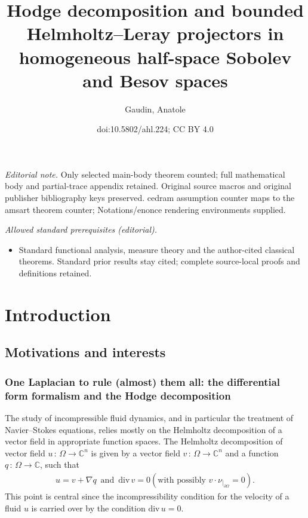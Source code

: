 \documentclass[10pt]{amsart}
\title{Hodge decomposition and bounded Helmholtz--Leray projectors in homogeneous half-space Sobolev and Besov spaces}
\author{Gaudin, Anatole}
\date{doi:10.5802/ahl.224; CC BY 4.0}
\theoremstyle{definition}\newtheorem{defi}[theo]{Definition}\newtheorem{rema}[theo]{Remark}\newtheorem{exam}[theo]{Example}\newtheorem{exem}[theo]{Example}\newtheorem{nota}[theo]{Notation}
\renewcommand*{\div}{\mathrm{div\,}}
\newcommand{\bbC}{\mathbb{C}}
\begin{document}
\maketitle
\noindent\textit{Editorial note.} Only selected main-body theorem counted; full mathematical body and partial-trace appendix retained. Original source macros and original publisher bibliography keys preserved. cedram assumption counter maps to the amsart theorem counter; Notations/enonce rendering environments supplied.\par\medskip
\noindent\textit{Allowed standard prerequisites (editorial).}\begin{itemize}
\item Standard functional analysis, measure theory and the author-cited classical theorems. Standard prior results stay cited; complete source-local proofs and definitions retained.
\end{itemize}\medskip
\setcounter{tocdepth}{3}
\tableofcontents

\section{Introduction}


\subsection{Motivations and interests}

\subsubsection{One Laplacian to rule (almost) them all: the differential form formalism and the Hodge decomposition}

The study of incompressible fluid dynamics, and in particular the treatment of Navier--Stokes equations, relies mostly on the Helmholtz decomposition of a vector field in appropriate function spaces. The Helmholtz decomposition of vector field $u\,:\,\Omega \longrightarrow \bbC^n$ is given by a vector field $v\,:\,\Omega \longrightarrow \bbC^n$ and a function $q\,:\,\Omega \longrightarrow \bbC$, such that
\begin{align*}
u = v+\nabla q \,\text{ and }\, \div v = 0  \left(\text{with possibly } v\cdot\nu_{|_{\partial\Omega}} = 0 \right).
\end{align*}
This point is central since the incompressibility condition for the velocity of a fluid $u$ is carried over by the condition $\div u=0$.
\end{document}
